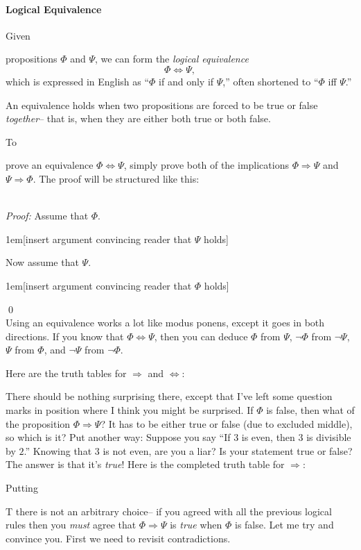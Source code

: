\documentclass[12pt]{article}
\newcommand{\done}{\\\hspace*{0pt}\hfill$\blacksquare$}
\newcommand{\ARR}{\Rightarrow}
\newcommand{\DARR}{\Leftrightarrow}
\newcounter{rule}
\newcounter{theorem}
\newcommand{\indented}[1]{\begin{adjustwidth}{1em}{}#1\end{adjustwidth}}
\def\thmcolonspace{\hspace{0.2em}}
\def\proofnewline{\\[0.75em]} %
\def\done{\qed\\[0em]} %
\newcommand{\thmbox}[1]{\fbox{\parbox{\textwidth}{{#1}}}}
\newcommand{\THMMOCK}[2]{\thmbox{\textbf{Theorem:} \thmcolonspace #1} \proofnewline \textit{Proof:} #2\done}
\def\pA{\Phi}
\def\pB{\Psi}
\begin{document}
\paragraph{Logical Equivalence}
\hypertarget{hl:DARR}{Given}  propositions $\pA$ and $\pB$, we can form the \emph{logical equivalence}
$$
\pA\DARR\pB,
$$
which is expressed in English as ``$\pA$ if and only if $\pB$,'' often shortened to ``$\pA$ iff $\pB$.''

An equivalence holds when two propositions are forced to be true or false \emph{together}--
that is, when they are either both true or both false.

\hypertarget{hl:DARRPV}{To} prove an equivalence $\pA\DARR\pB$, simply prove both of the implications $\pA\ARR\pB$ and $\pB\ARR\pA$.
The proof will be structured like this:

\THMMOCK{$\pA\DARR\pB$.}{
Assume that $\pA$.
\indented{[insert argument convincing reader that $\pB$ holds]}
Now assume that $\pB$.
\indented{[insert argument convincing reader that $\pA$ holds]}
}

\hypertarget{hl:DARRUSE}{Using} an equivalence works a lot like modus ponens, except it goes in both directions.
If you know that $\pA\DARR\pB$, then you can deduce $\pA$ from $\pB$, $\neg\pA$ from $\neg\pB$,
$\pB$ from $\pA$, and $\neg\pB$ from $\neg\pA$.



\def\sp{\hspace{1em}}

Here are the truth tables for $\ARR$ and $\DARR$:
\begin{center}
\truthtablefour{$\pA\ARR\pB$}{???}{???}{F}{T}
\sp
\truthtablefour{$\pA\DARR\pB$}{T}{F}{F}{T}
\end{center}
There should be nothing surprising there, except that I've left some question marks in position where I think you might be surprised.
If $\pA$ is false, then what of the proposition $\pA\ARR\pB$?
It has to be either true or false (due to excluded middle), so which is it?
Put another way: Suppose you say ``If $3$ is even, then $3$ is divisible by $2$.''
Knowing that $3$ is not even, are you a liar? Is your statement true or false?
The answer is that it's \emph{true}!
Here is the completed truth table for $\ARR$:
\begin{center}
\truthtablefour{$\pA\ARR\pB$}{T}{T}{F}{T}
\end{center}
\hypertarget{hl:vacuous}{Putting} T there is not an arbitrary choice-- if you agreed with all the previous logical rules then you \emph{must} agree
that $\pA\ARR\pB$ is \emph{true} when $\pA$ is false.
Let me try and convince you. First we need to revisit contradictions.
\end{document}
